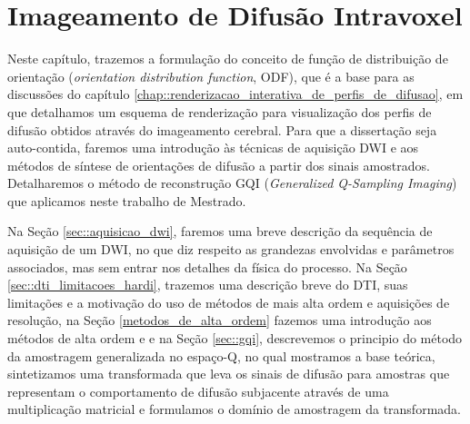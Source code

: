 \documentclass[
    12pt,                %
    oneside,            %
    a4paper,            %
    english,            %
    french,                %
    spanish,            %
    brazil                %
    ]{abntex2}
\begin{document}




\chapter{Imageamento de Difusão Intravoxel}
\label{chapter::metodos_hardi}

Neste capítulo, trazemos a formulação do conceito de função de distribuição de orientação (\textit{orientation distribution function}, ODF), que é a base para as discussões do capítulo \ref{chap::renderizacao_interativa_de_perfis_de_difusao}, em que detalhamos um esquema de renderização para visualização dos perfis de difusão obtidos através do imageamento cerebral. Para que a dissertação seja auto-contida, faremos uma introdução às técnicas de aquisição DWI e aos métodos de síntese de orientações de difusão a partir dos sinais amostrados. Detalharemos o método de reconstrução GQI (\textit{Generalized Q-Sampling Imaging}) que aplicamos neste trabalho de Mestrado.

Na Seção \ref{sec::aquisicao_dwi}, faremos uma breve descrição da sequência de aquisição de um DWI, no que diz respeito as grandezas envolvidas e parâmetros associados, mas sem entrar nos detalhes da física do processo. Na Seção \ref{sec::dti_limitacoes_hardi}, trazemos uma descrição breve do DTI, suas limitações e a motivação do uso de métodos de mais alta ordem e aquisições de resolução, na Seção \ref{metodos_de_alta_ordem} fazemos uma introdução aos métodos de alta ordem e  e na Seção \ref{sec::gqi}, descrevemos o principio do método da amostragem generalizada no espaço-Q, no qual mostramos a base teórica, sintetizamos uma transformada que leva os sinais de difusão para amostras que representam o comportamento de difusão subjacente através de uma multiplicação matricial e formulamos o domínio de amostragem da transformada. %
\end{document}
